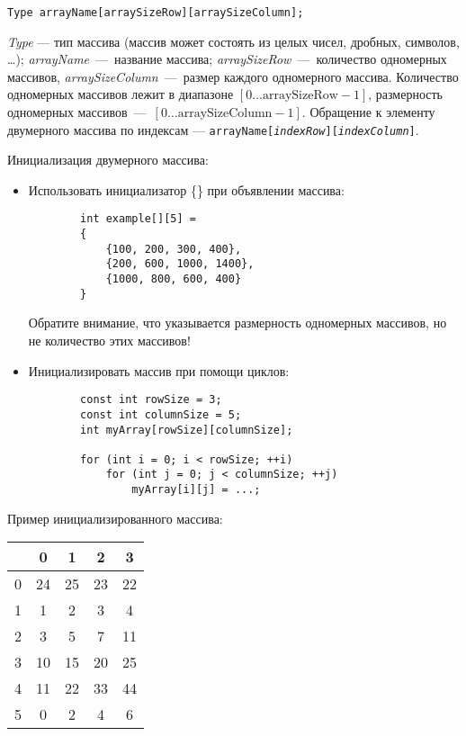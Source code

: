 \lstinline|Type arrayName[arraySizeRow][arraySizeColumn];|

\textit{Type} --- тип массива (массив может состоять из целых чисел, дробных, символов, \ldots); \textit{arrayName}~---~название массива; \textit{arraySizeRow}~---~количество одномерных массивов, \textit{arraySizeColumn}~---~размер каждого одномерного массива. Количество одномерных массивов лежит в диапазоне $\left[ 0 \ldots \text{arraySizeRow} - 1 \right]$, размерность одномерных массивов~---~$\left[ 0 \ldots \text{arraySizeColumn} - 1 \right]$. Обращение к элементу двумерного массива по индексам --- \texttt{arrayName[\textit{indexRow}][\textit{indexColumn}]}.

Инициализация двумерного массива:
\begin{itemize}
    \item Использовать инициализатор \{\} при объявлении массива:
    \begin{lstlisting}
        int example[][5] =
        {
            {100, 200, 300, 400},
            {200, 600, 1000, 1400},
            {1000, 800, 600, 400}
        }
    \end{lstlisting}

    Обратите внимание, что указывается размерность одномерных массивов, но не количество этих массивов!

    \item Инициализировать массив при помощи циклов:
    \begin{lstlisting}
        const int rowSize = 3;
        const int columnSize = 5;
        int myArray[rowSize][columnSize];

        for (int i = 0; i < rowSize; ++i)
            for (int j = 0; j < columnSize; ++j)
                myArray[i][j] = ...;
    \end{lstlisting}
\end{itemize}

Пример инициализированного массива:
\begin{table}[h]
    \begin{tabular}{|c|c|c|c|c|}
        \hline
          & 0 & 1 & 2 & 3 \\
        \hline
        0 & 24 & 25 & 23 & 22 \\
        \hline
        1 & 1 & 2 & 3 & 4 \\
        \hline
        2 & 3 & 5 & 7 & 11 \\
        \hline
        3 & 10 & 15 & 20 & 25 \\
        \hline
        4 & 11 & 22 & 33 & 44 \\
        \hline
        5 & 0 & 2 & 4 & 6 \\
        \hline
    \end{tabular}
\end{table}


